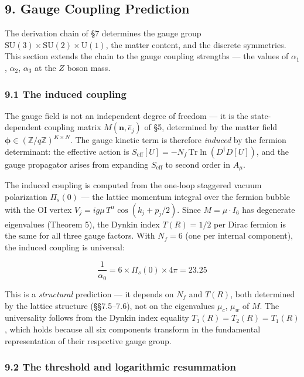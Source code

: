 \documentclass[
  11pt,
]{article}
\begin{document}
\hypertarget{gauge-coupling-prediction}{%
\subsection{9. Gauge Coupling
Prediction}\label{gauge-coupling-prediction}}

The derivation chain of §7 determines the gauge group
\(\mathrm{SU}(3) \times \mathrm{SU}(2) \times \mathrm{U}(1)\), the
matter content, and the discrete symmetries. This section extends the
chain to the gauge coupling strengths --- the values of \(\alpha_1\),
\(\alpha_2\), \(\alpha_3\) at the \(Z\) boson mass.

\hypertarget{the-induced-coupling}{%
\subsubsection{9.1 The induced coupling}\label{the-induced-coupling}}

The gauge field is not an independent degree of freedom --- it is the
state-dependent coupling matrix \(M(\mathbf{n}, \hat{e}_j)\) of §5,
determined by the matter field
\(\boldsymbol{\phi} \in (\mathbb{Z}/q\mathbb{Z})^{K \times N}\). The
gauge kinetic term is therefore \emph{induced} by the fermion
determinant: the effective action is
\(S_{\text{eff}}[U] = -N_f \, \mathrm{Tr} \ln(D^\dagger D[U])\), and the
gauge propagator arises from expanding \(S_{\text{eff}}\) to second
order in \(A_\mu\).

The induced coupling is computed from the one-loop staggered vacuum
polarization \(\Pi_s(0)\) --- the lattice momentum integral over the
fermion bubble with the OI vertex
\(V_j = i g \mu \, T^\alpha \cos(k_j + p_j/2)\). Since
\(M = \mu \cdot I_6\) has degenerate eigenvalues (Theorem 5), the Dynkin
index \(T(R) = 1/2\) per Dirac fermion is the same for all three gauge
factors. With \(N_f = 6\) (one per internal component), the induced
coupling is universal:

\[\frac{1}{\alpha_0} = 6 \times \Pi_s(0) \times 4\pi = 23.25\]

This is a \emph{structural} prediction --- it depends on \(N_f\) and
\(T(R)\), both determined by the lattice structure (§§7.5--7.6), not on
the eigenvalues \(\mu_c\), \(\mu_w\) of \(M\). The universality follows
from the Dynkin index equality \(T_3(R) = T_2(R) = T_1(R)\), which holds
because all six components transform in the fundamental representation
of their respective gauge group.

\hypertarget{the-threshold-and-logarithmic-resummation}{%
\subsubsection{9.2 The threshold and logarithmic
resummation}\label{the-threshold-and-logarithmic-resummation}}
\end{document}
